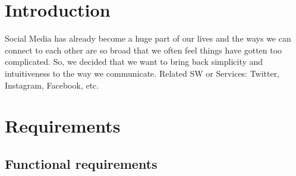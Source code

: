\documentclass[conference]{IEEEtran}
\numberwithin{figure}{subsection}
\begin{document}
\section{Introduction} 
Social Media has already become a huge part of our lives and the ways we can connect to each other are so broad that we often feel things have gotten too complicated. So, we decided that we want to bring back simplicity and intuitiveness to the way we communicate. Related SW or Services: Twitter, Instagram, Facebook, etc. 
\newline

\section{Requirements}
\subsection{Functional requirements}
\end{document}
